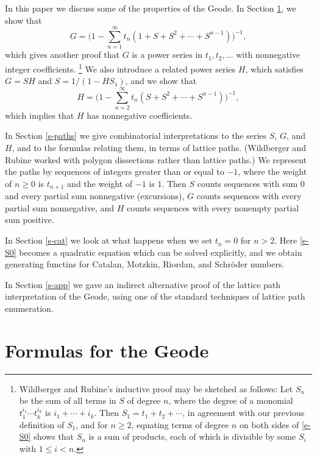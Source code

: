 \documentclass[12pt,reqno, oneside]{amsart}
\begin{document}
In this paper we discuss some of the properties of the Geode. In Section \ref{s-formulas}, we show that 
\begin{equation*}
G=\biggl(1-\sum_{n=1}^\infty t_n (1+S+S^2+\cdots+S^{n-1})\biggr)^{-1},\label{e-G20}
\end{equation*}
which gives another proof that $G$ is a power series in $t_1,t_2,\dots$ with nonnegative integer coefficients.%
\footnote{Wildberger and Rubine's inductive proof may be sketched as follows: Let $S_n$ be the sum of all terms in $S$ of degree $n$, where the degree of a monomial $t_1^{i_1}\cdots t_{k}^{i_k}$ is $i_1+\cdots + i_k$. Then $S_1=t_1+t_2+\cdots$, in agreement with our previous definition of $S_1$, and for $n\ge2$, equating terms of degree $n$ on both sides of \eqref{e-S0} shows that $S_n$ is a sum of products, each of which is divisible by some $S_i$ with $1\le i <n$.
}
 We also introduce a related power series $H$, which satisfies $G=SH$ and 
$S=1/(1-H S_1)$, and we show that
\begin{equation*}
\label{e-H20}
H=\biggl( 1-\sum_{n=2}^\infty t_n (S+S^2+\cdots+S^{n-1})\biggr)^{-1},
\end{equation*}
which implies that $H$ has nonnegative coefficients.

In Section \ref{s-paths} we give combinatorial interpretations to the series $S$, $G$, and $H$, and to the formulas relating them, in terms of lattice paths. (Wildberger and Rubine worked with polygon dissections rather than lattice paths.) We represent  the paths by sequences of integers greater than or equal to $-1$, where the weight of $n\ge0$ is $t_{n+1}$ and the weight of $-1$ is $1$. Then $S$ counts sequences with sum 0 and every partial sum nonnegative (excursions), $G$ counts sequences with every partial sum nonnegative, and $H$ counts sequences with every nonempty partial sum positive. 

In Section \ref{s-cat} we look at what happens when we set $t_n=0$ for $n>2$. Here \eqref{e-S0} becomes a quadratic equation which can be solved explicitly, and we obtain generating functins for Catalan, Motzkin, Riordan, and Schr\"oder numbers.

In Section \ref{s-app} we gave an indirect alternative proof of the lattice path interpretation of the Geode, using one of the standard techniques of lattice path enumeration.
 
\section{Formulas for the Geode}
\label{s-formulas}
\end{document}
